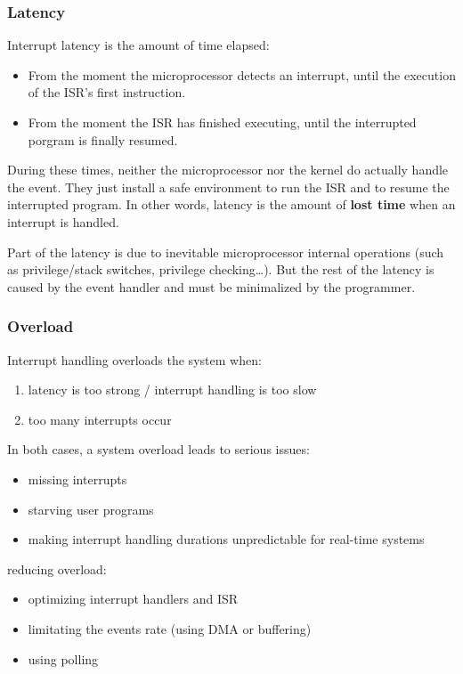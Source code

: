 %
%
%

\begin{frame}
  \frametitle{Latency}

  Interrupt latency is the amount of time elapsed:

  \begin{itemize}
  \item From the moment the microprocessor detects an interrupt, until the
    execution of the ISR's first instruction.
  \item From the moment the ISR has finished executing, until the interrupted
    porgram is finally resumed.
  \end{itemize}

  \-

  During these times, neither the microprocessor nor the kernel do actually
  handle the event. They just install a safe environment to run the ISR and to
  resume the interrupted program. In other words, latency is the amount of
  {\bf lost time} when an interrupt is handled.

  \-

  Part of the latency is due to inevitable microprocessor internal operations
  (such as privilege/stack switches, privilege checking\ldots). But the rest of
  the latency is caused by the event handler and must be minimalized by the
  programmer.

\end{frame}

%
%
%

\begin{frame}
  \frametitle{Overload}

  Interrupt handling overloads the system when:

  \begin{enumerate}
    \item latency is too strong / interrupt handling is too slow
    \item too many interrupts occur
  \end{enumerate}

  \-

  In both cases, a system overload leads to serious issues:

  \begin{itemize}
    \item missing interrupts
    \item starving user programs
    \item making interrupt handling durations unpredictable for real-time systems
  \end{itemize}

  \-

  reducing overload:
  \begin{itemize}
    \item optimizing interrupt handlers and ISR
    \item limitating the events rate (using DMA or buffering)
    \item using polling
  \end{itemize}

\end{frame}

